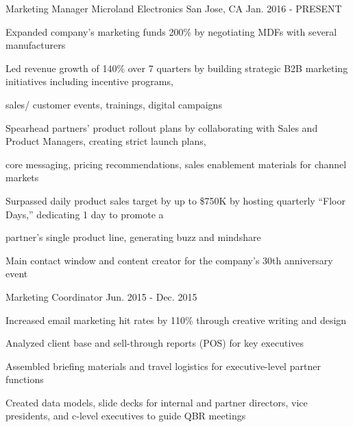 

\begin{cventries}

  \cventry
    {Marketing Manager} %
    {Microland Electronics} %
    {San Jose, CA} %
    {Jan. 2016 - PRESENT} %
    {
      \begin{cvitems} %
               \item {Expanded company’s marketing funds 200\% by negotiating MDFs with several manufacturers}
       \item {Led revenue growth of 140\% over 7 quarters by building strategic B2B marketing initiatives including incentive programs,}
       \item{sales/ customer events, trainings, digital campaigns}
        \item {Spearhead partners’ product rollout plans by collaborating with Sales and Product Managers, creating strict launch plans,} 
        \item{core messaging, pricing recommendations, sales enablement materials for channel markets}
        \item {Surpassed daily product sales target by up to \$750K by hosting quarterly “Floor Days,” dedicating 1 day to promote a}
        \item{partner’s single product line, generating buzz and mindshare}
        \item {Main contact window and content creator for the company’s 30th anniversary event}
      \end{cvitems}
    }

  \cventry
    {Marketing Coordinator} %
    {} %
    {} %
    {Jun. 2015 - Dec. 2015} %
    {
      \begin{cvitems} %
        \item {Increased email marketing hit rates by 110\% through creative writing and design}
        \item {Analyzed client base and sell-through reports (POS) for key executives}
        \item {Assembled briefing materials and travel logistics for executive-level partner functions}
                \item {Created data models, slide decks for internal and partner directors, vice presidents, and c-level executives to guide QBR meetings}
      \end{cvitems}
    }

  
\end{cventries}
